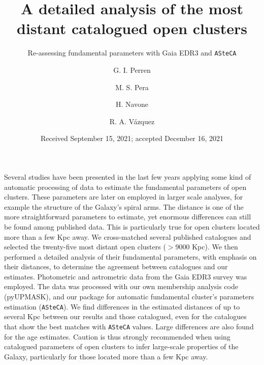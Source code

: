 \documentclass[draft]{aa}
\begin{document}
 


\title{A detailed analysis of the most distant catalogued open clusters}
\subtitle{Re-assessing fundamental parameters with Gaia EDR3 and \texttt{ASteCA}}

\author{G. I. Perren
      \and
      M. S. Pera
      \and
      H. Navone
      \and
      R. A. Vázquez
}

\date{Received September 15, 2021; accepted December 16, 2021}

 
\abstract
{Several studies have been presented in the last few years applying some kind of
automatic processing of data to estimate the fundamental parameters of open
clusters. These parameters are later on employed in larger scale analyses, for
example the structure of the Galaxy's spiral arms.
The distance is one of the more straightforward parameters to estimate, yet
enormous differences can still be found among published data. This is
particularly true for open clusters located more than a few Kpc away.}
{
We cross-matched several published catalogues and selected the twenty-five most
distant open clusters ($>$9000 Kpc). We then performed a detailed analysis of
their fundamental parameters, with emphasis on their distances, to determine the
agreement between catalogues and our estimates.}
{Photometric and astrometric data from the Gaia EDR3 survey was employed. The
data was processed with our own membership analysis code (pyUPMASK), and our
package for automatic fundamental cluster's parameters estimation
(\texttt{ASteCA}).}
{We find differences in the estimated distances of up to several Kpc
between our results and those catalogued, even for the catalogues that show the
best matches with \texttt{ASteCA} values. Large differences are also found for
the age estimates.}
{Caution is thus strongly recommended when using catalogued parameters of open
clusters to infer large-scale properties of the Galaxy, particularly for those
located more than a few Kpc away.}
\end{document}

